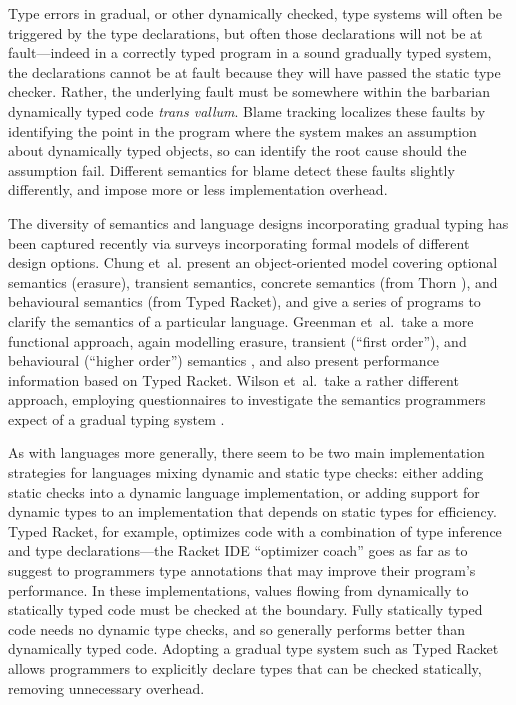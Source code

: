 Type errors in gradual, or other dynamically checked, type systems will
often be triggered by the type declarations, but often those
declarations will not be at fault---indeed in a correctly typed
program in a sound gradually typed system,  the declarations cannot be
at fault because they will have passed the static type
checker. Rather, the underlying fault must be somewhere within the
barbarian dynamically typed code \emph{trans vallum}.
Blame tracking\citep{blame2009,blameThreesomes2010,blameForAll2011} localizes these
faults by identifying 
the point in the program where the system makes an 
assumption about dynamically typed objects, so can identify the root
cause should the assumption fail.  Different semantics for blame
detect these faults slightly differently, and impose more or less
implementation
overhead\citep{reticPython2014,monotonic2015,Vitousek2017}.

The diversity of semantics and language designs incorporating
gradual typing has been captured recently via surveys
incorporating formal models of different design options.
Chung et~al.\citep{kafka18} present an object-oriented model covering optional
semantics (erasure),  transient semantics, concrete semantics (from Thorn
\cite{Bloom2009}), and behavioural semantics (from Typed Racket), and
give a series of programs to clarify the semantics of a
particular language.  
Greenman et~al.\ take a more functional approach, again modelling
erasure, transient (``first order''), and behavioural (``higher
order'') semantics \cite{bensurvey18icfp}, and also present
performance information based on Typed Racket.
Wilson et~al.\ take a rather different approach, employing
questionnaires to investigate the semantics programmers expect of a
gradual typing system  \cite{shriramdls18}.

As with languages more generally, there seem to be two main implementation
strategies for languages mixing dynamic and static type checks: either
adding static checks into a dynamic language implementation, or adding
support for dynamic types to an implementation that depends on
static types for efficiency. Typed Racket, for example, optimizes code with
a combination of type inference and type declarations---the Racket
IDE ``optimizer coach'' goes as far as to suggest to programmers type
annotations that may improve their program's performance\citep{optimizerCoach2012}. In these implementations, values flowing
from dynamically to statically typed code must be checked at the
boundary.  Fully statically typed code needs no dynamic type checks,
and so generally performs better than dynamically typed code. Adopting
a gradual type system such as Typed Racket\citep{typedScheme08} allows
programmers to explicitly declare types that can be checked statically,
removing unnecessary overhead.

